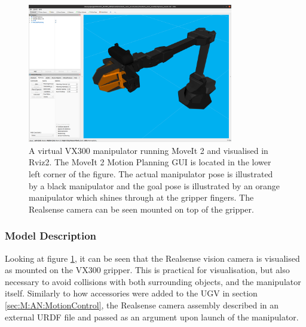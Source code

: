 \begin{figure}[htp!]
  \centering
  \includegraphics[width = 0.8\textwidth]{Figures/figVX300Moveit.png}
  \caption{A virtual VX300 manipulator running MoveIt 2 and visualised in Rviz2. The MoveIt 2 Motion Planning GUI is located in the lower left corner of the figure. The actual manipulator pose is illustrated by a black manipulator and the goal pose is illustrated by an orange manipulator which shines through at the gripper fingers. The Realsense camera can be seen mounted on top of the gripper.}
  \label{fig:VX300Moveit}
\end{figure}

\subsubsection{Model Description}
Looking at figure \ref{fig:VX300Moveit}, it can be seen that the Realsense vision camera is visualised as mounted on the VX300 gripper. This is practical for visualisation, but also necessary to avoid collisions with both surrounding objects, and the manipulator itself. Similarly to how accessories were added to the UGV in section \ref{sec:M:AN:MotionControl}, the Realsense camera assembly described in an external URDF file and passed as an argument upon launch of the manipulator.

\FloatBarrier
